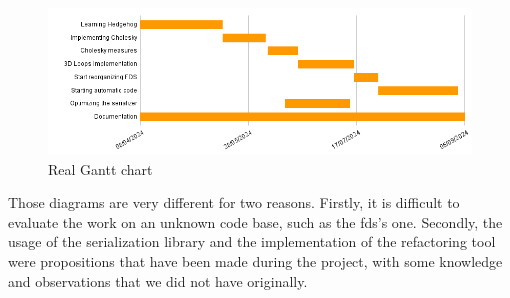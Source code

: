 \begin{figure}[h!]
  \begin{center}
    \includegraphics[scale=0.5]{img/real-gantt-chart.png}
    \caption{Real Gantt chart}
    \label{fig:realgantt}
  \end{center}
\end{figure}

Those diagrams are very different for two reasons. Firstly, it is difficult to
evaluate the work on an unknown code base, such as the \gls{fds}'s one.
Secondly, the usage of the serialization library and the implementation of the
refactoring tool were propositions that have been made during the project, with
some knowledge and observations that we did not have originally.
